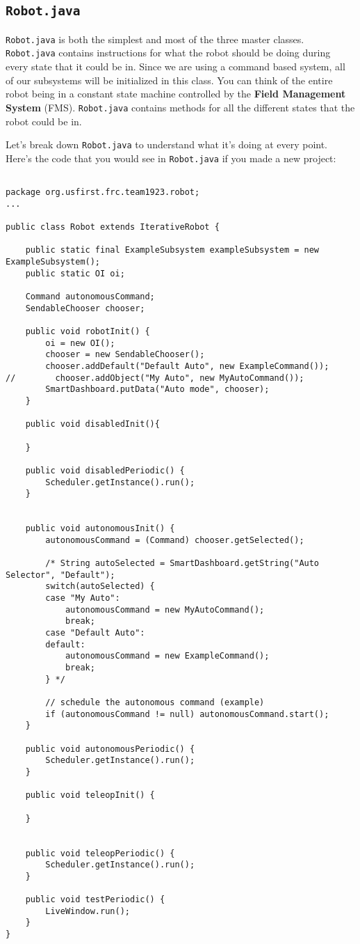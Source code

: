 \documentclass[11pt,fleqn]{article}
\begin{document}
\subsection{\texttt{Robot.java}}

\texttt{Robot.java} is both the simplest and most of the three master classes. \texttt{Robot.java} contains
instructions for what the robot should be doing during every state that it could be in. Since we are using
a command based system, all of our subsystems will be initialized in this class. You can think of the
entire robot being in a constant state machine controlled by the \textbf{Field Management System} (FMS).
\texttt{Robot.java} contains methods for all the different states that the robot could be in.


Let's break down \texttt{Robot.java} to understand what it's doing at every point. Here's the code that
you would see in \texttt{Robot.java} if you made a new project:

\begin{verbatim}

package org.usfirst.frc.team1923.robot;
...

public class Robot extends IterativeRobot {

	public static final ExampleSubsystem exampleSubsystem = new ExampleSubsystem();
	public static OI oi;

    Command autonomousCommand;
    SendableChooser chooser;

    public void robotInit() {
		oi = new OI();
        chooser = new SendableChooser();
        chooser.addDefault("Default Auto", new ExampleCommand());
//        chooser.addObject("My Auto", new MyAutoCommand());
        SmartDashboard.putData("Auto mode", chooser);
    }

    public void disabledInit(){

    }

    public void disabledPeriodic() {
		Scheduler.getInstance().run();
    }


    public void autonomousInit() {
        autonomousCommand = (Command) chooser.getSelected();

		/* String autoSelected = SmartDashboard.getString("Auto Selector", "Default");
		switch(autoSelected) {
		case "My Auto":
			autonomousCommand = new MyAutoCommand();
			break;
		case "Default Auto":
		default:
			autonomousCommand = new ExampleCommand();
			break;
		} */

    	// schedule the autonomous command (example)
        if (autonomousCommand != null) autonomousCommand.start();
    }

    public void autonomousPeriodic() {
        Scheduler.getInstance().run();
    }

    public void teleopInit() {

    }


    public void teleopPeriodic() {
        Scheduler.getInstance().run();
    }

    public void testPeriodic() {
        LiveWindow.run();
    }
}
\end{verbatim}
\end{document}

